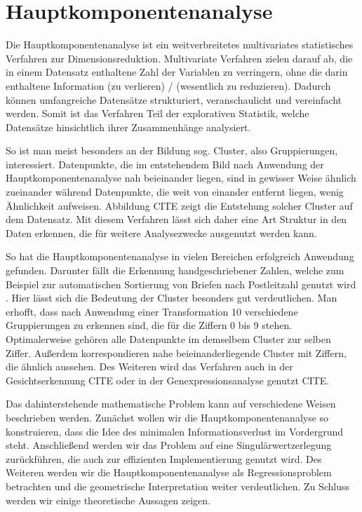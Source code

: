 \chapter{Hauptkomponentenanalyse}

\label{pca}

Die Hauptkomponentenanalyse ist ein weitverbreitetes multivariates statistisches Verfahren zur Dimensionsreduktion. Multivariate Verfahren zielen darauf ab, die in einem Datensatz enthaltene Zahl der Variablen zu verringern, ohne die darin enthaltene Information (zu verlieren) / (wesentlich zu reduzieren). Dadurch können umfangreiche Datensätze strukturiert, veranschaulicht und vereinfacht werden. Somit ist das Verfahren Teil der explorativen Statistik, welche Datensätze hinsichtlich ihrer Zusammenhänge analysiert.

So ist man meist besonders an der Bildung sog. Cluster, also Gruppierungen, interessiert. Datenpunkte, die im entstehendem Bild nach Anwendung der Hauptkomponentenanalyse nah beieinander liegen, sind in gewisser Weise ähnlich zueinander während Datenpunkte, die weit von einander entfernt liegen, wenig Ähnlichkeit aufweisen. Abbildung CITE zeigt die Entstehung solcher Cluster auf dem Datensatz. Mit diesem Verfahren lässt sich daher eine Art Struktur in den Daten erkennen, die für weitere Analysezwecke ausgenutzt werden kann.

So hat die Hauptkomponentenanalyse in vielen Bereichen erfolgreich Anwendung gefunden. Darunter fällt die Erkennung handgeschriebener Zahlen, welche zum Beispiel zur automatischen Sortierung von Briefen nach Postleitzahl genutzt wird \cite{hastie_elements}. Hier lässt sich die Bedeutung der Cluster besonders gut verdeutlichen. Man erhofft, dass nach Anwendung einer Transformation 10 verschiedene Gruppierungen zu erkennen sind, die für die Ziffern 0 bis 9 stehen. Optimalerweise gehören alle Datenpunkte im demselbem Cluster zur selben Ziffer. Außerdem korrespondieren nahe beieinanderliegende Cluster mit Ziffern, die ähnlich aussehen. Des Weiteren wird das Verfahren auch in der Gesichtserkennung CITE oder in der Genexpressionsanalyse genutzt CITE.

Das dahinterstehende mathematische Problem kann auf verschiedene Weisen beschrieben werden. Zunächst wollen wir die Hauptkomponentenanalyse so konstruieren, dass die Idee des minimalen Informationsverlust im Vordergrund steht. Anschließend werden wir das Problem auf eine Singulärwertzerlegung zurückführen, die auch zur effizienten Implementierung genutzt wird. Des Weiteren werden wir die Hauptkomponentenanalyse als Regressionsproblem betrachten und die geometrische Interpretation weiter verdeutlichen. Zu Schluss werden wir einige theoretische Aussagen zeigen.


